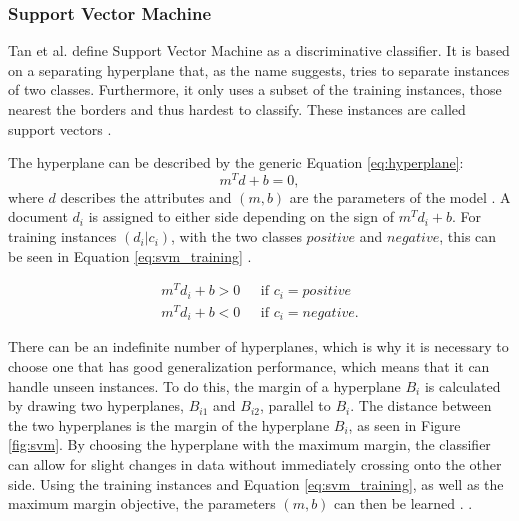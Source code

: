 \subsubsection{Support Vector Machine}
Tan et al. define Support Vector Machine as a discriminative classifier. It is based on a separating hyperplane that, as the name suggests, tries to separate instances of two classes. Furthermore, it only uses a subset of the training instances, those nearest the borders and thus hardest to classify. These instances are called support vectors \cite{DBLP:books/aw/TanSKK2019}.

The hyperplane can be described by the generic Equation \eqref{eq:hyperplane}:
    \begin{equation}
            \label{eq:hyperplane}
                m^Td + b = 0,
        \end{equation}
    where $d$ describes the attributes and $(m, b)$ are the parameters of the model \cite{DBLP:books/aw/TanSKK2019}. A document $d_i$ is assigned to either side depending on the sign of $m^Td_i + b$. For training instances $(d_i|c_i)$, with the two classes $positive$ and $negative$, this can be seen in Equation \eqref{eq:svm_training} \cite{DBLP:books/aw/TanSKK2019}.
    
    \begin{equation}
            \begin{split}
            \label{eq:svm_training}
                m^Td_i + b > 0 & \text{~~if~} c_i = positive \\
                m^Td_i + b < 0 & \text{~~if~} c_i = negative.
            \end{split}
    \end{equation}
    
    There can be an indefinite number of hyperplanes, which is why it is necessary to choose one that has good generalization performance, which means that it can handle unseen instances. To do this, the margin of a hyperplane $B_i$ is calculated by drawing two hyperplanes, $B_{i1}$ and $B_{i2}$, parallel to $B_i$. The distance between the two hyperplanes is the margin of the hyperplane $B_i$, as seen in Figure \ref{fig:svm}. By choosing the hyperplane with the maximum margin, the classifier can allow for slight changes in data without immediately crossing onto the other side. Using the training instances and Equation \eqref{eq:svm_training}, as well as the maximum margin objective, the parameters $(m,b)$ can then be learned \cite{DBLP:books/aw/TanSKK2019}. .

